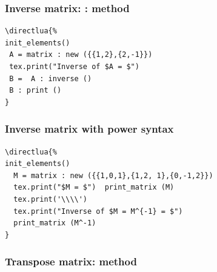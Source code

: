 
\subsubsection{Inverse matrix: : method  } %
\label{ssub:inverse_matrix}

\begin{minipage}{.6\textwidth}
\begin{Verbatim}
\directlua{%
init_elements()
 A = matrix : new ({{1,2},{2,-1}}) 
 tex.print("Inverse of $A = $")
 B =  A : inverse ()
 B : print ()
}
\end{Verbatim}
\end{minipage}
\begin{minipage}{.4\textwidth}
\end{minipage}

\subsubsection{Inverse matrix with power syntax} %
\label{ssub:inverse_matrix_with_power_syntax}

\begin{minipage}{.6\textwidth}
\begin{Verbatim}
\directlua{%
init_elements()
  M = matrix : new ({{1,0,1},{1,2, 1},{0,-1,2}})
  tex.print("$M = $")  print_matrix (M) 
  tex.print('\\\\')
  tex.print("Inverse of $M = M^{-1} = $")
  print_matrix (M^-1)
}
\end{Verbatim}
\end{minipage}
\begin{minipage}{.4\textwidth}
\end{minipage}


\subsubsection{Transpose matrix: method  } %
\label{ssub:transpose_matrix}

